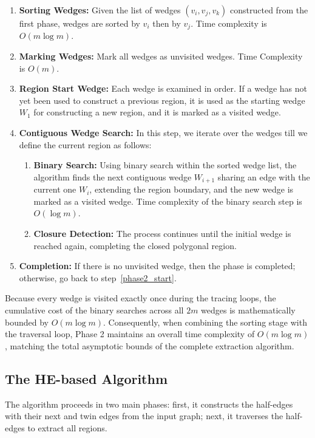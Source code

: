\begin{enumerate}
    \item \textbf{Sorting Wedges:} Given the list of wedges \( (v_i, v_j, v_k) \) constructed from the first phase, wedges are sorted by \( v_i \) then by \( v_j \). Time complexity is \( O(m \log m) \).
    \item \textbf{Marking Wedges:} Mark all wedges as unvisited wedges. Time Complexity is \( O (m) \).
    \item \label{phase2_start} \textbf{Region Start Wedge:} Each wedge is examined in order. If a wedge has not yet been used to construct a previous region, it is used as the starting wedge \( W_1 \) for constructing a new region, and it is marked as a visited wedge.
    \item \textbf{Contiguous Wedge Search:} In this step, we iterate over the wedges till we define the current region as follows: 
    \begin{enumerate}
        \item \textbf{Binary Search:} Using binary search within the sorted wedge list, the algorithm finds the next contiguous wedge \( W_{i + 1}\) sharing an edge with the current one \( W_i \), extending the region boundary, and the new wedge is marked as a visited wedge. Time complexity of the binary search step is \( O (\log m) \).
        \item \textbf{Closure Detection:} The process continues until the initial wedge is reached again, completing the closed polygonal region.
    \end{enumerate}
    \item \textbf{Completion:} If there is no unvisited wedge, then the phase is completed; otherwise, go back to step~\ref{phase2_start}.
\end{enumerate}
Because every wedge is visited exactly once during the tracing loops, the cumulative cost of the binary searches across all $2m$ wedges is mathematically bounded by $O(m \log m)$. Consequently, when combining the sorting stage with the traversal loop, Phase 2 maintains an overall time complexity of $O(m \log m)$, matching the total asymptotic bounds of the complete extraction algorithm.


\subsection{The HE-based Algorithm}
The algorithm proceeds in two main phases: first, it constructs the half-edges with their next and twin edges from the input graph; next, it traverses the half-edges to extract all regions.

